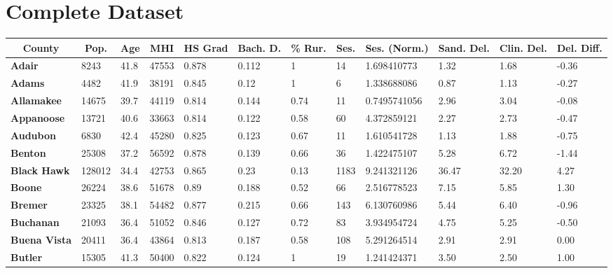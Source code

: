 \documentclass[11pt]{article}
\begin{document}
\section{Complete Dataset}
\begin{table}[H]

\centering
\tiny
\begin{tabular}{llllllllllll}
\multicolumn{1}{c}{\textbf{County}} & \multicolumn{1}{c}{\textbf{Pop.}} & \multicolumn{1}{c}{\textbf{Age}} & \multicolumn{1}{c}{\textbf{MHI}} & \multicolumn{1}{c}{\textbf{HS Grad}} & \multicolumn{1}{c}{\textbf{Bach. D.}} & \multicolumn{1}{c}{\textbf{\% Rur.}} & \multicolumn{1}{c}{\textbf{Ses.}} & \multicolumn{1}{c}{\textbf{Ses. (Norm.)}} & \multicolumn{1}{c}{\textbf{Sand. Del.}} & \multicolumn{1}{c}{\textbf{Clin. Del.}} & \multicolumn{1}{c}{\textbf{Del. Diff.}} \\ \toprule
\textbf{Adair} & 8243 & 41.8 & 47553 & 0.878 & 0.112 & 1 & 14 & 1.698410773 & 1.32 & 1.68 & -0.36 \\
\textbf{Adams} & 4482 & 41.9 & 38191 & 0.845 & 0.12 & 1 & 6 & 1.338688086 & 0.87 & 1.13 & -0.27 \\
\textbf{Allamakee} & 14675 & 39.7 & 44119 & 0.814 & 0.144 & 0.74 & 11 & 0.7495741056 & 2.96 & 3.04 & -0.08 \\
\textbf{Appanoose} & 13721 & 40.6 & 33663 & 0.814 & 0.122 & 0.58 & 60 & 4.372859121 & 2.27 & 2.73 & -0.47 \\
\textbf{Audubon} & 6830 & 42.4 & 45280 & 0.825 & 0.123 & 0.67 & 11 & 1.610541728 & 1.13 & 1.88 & -0.75 \\
\textbf{Benton} & 25308 & 37.2 & 56592 & 0.878 & 0.139 & 0.66 & 36 & 1.422475107 & 5.28 & 6.72 & -1.44 \\
\textbf{Black Hawk} & 128012 & 34.4 & 42753 & 0.865 & 0.23 & 0.13 & 1183 & 9.241321126 & 36.47 & 32.20 & 4.27 \\
\textbf{Boone} & 26224 & 38.6 & 51678 & 0.89 & 0.188 & 0.52 & 66 & 2.516778523 & 7.15 & 5.85 & 1.30 \\
\textbf{Bremer} & 23325 & 38.1 & 54482 & 0.877 & 0.215 & 0.66 & 143 & 6.130760986 & 5.44 & 6.40 & -0.96 \\
\textbf{Buchanan} & 21093 & 36.4 & 51052 & 0.846 & 0.127 & 0.72 & 83 & 3.934954724 & 4.75 & 5.25 & -0.50 \\
\textbf{Buena Vista} & 20411 & 36.4 & 43864 & 0.813 & 0.187 & 0.58 & 108 & 5.291264514 & 2.91 & 2.91 & 0.00 \\
\textbf{Butler} & 15305 & 41.3 & 50400 & 0.822 & 0.124 & 1 & 19 & 1.241424371 & 3.50 & 2.50 & 1.00 \\

\end{tabular}
\end{table}
\end{document}

